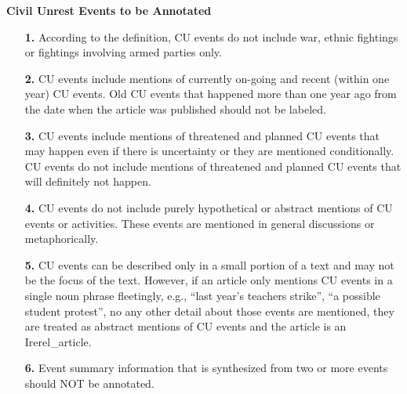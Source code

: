 {\bf Civil Unrest Events to be Annotated}
\begin{enumerate}
\item[{\bf 1.}]According to the definition, CU events do not include war, ethnic fightings 
or fightings involving armed parties only. 
\item[{\bf 2.}] CU events include mentions of currently on-going and 
recent (within one year) CU events.
Old CU events that happened more than one year ago from the date when the article was 
published should not be labeled.
\item[{\bf 3.}] CU events include mentions of threatened and planned CU events that 
may happen even if there is uncertainty or they are mentioned conditionally. 
CU events do not include mentions of threatened and planned CU events that
will definitely not happen.
\item[{\bf 4.}] CU events do not include purely hypothetical or abstract mentions 
of CU events or activities. 
These events are mentioned in general discussions or metaphorically.
\item[{\bf 5.}] CU events can be described only in a small portion of a text 
and may not be the focus of the text.
However, if an article only mentions CU events in a single noun phrase fleetingly, 
e.g., ``last year's teachers strike'', ``a possible student protest'', 
no any other detail about those events are mentioned,
they are treated as abstract mentions of CU events and the article is an Irerel\_article.
\item[{\bf 6.}] Event summary information that is synthesized from two or more events 
should NOT be annotated.

\end{enumerate}





